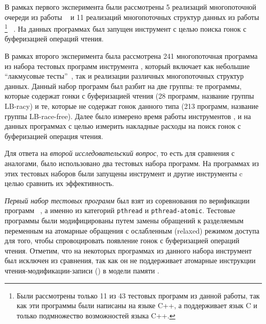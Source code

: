 В рамках первого эксперимента были рассмотрены 
5 реализаций многопоточной очереди из работы%
~\cite{Kokologiannakis:PLDI2019}
и 11 реализаций многопоточных структур данных из работы%
\footnote{Были рассмотрены только 11 из 43 
тестовых программ из данной работы, 
так как эти программы были написаны на языке C++,
а \genmc поддерживает язык C и только подмножество возможностей языка C++.}
~\cite{Ou-Demsky:OOPSLA18}.
На данных программах был запущен инструмент \wmc с целью 
поиска гонок с буферизацией операций чтения.


В рамках второго эксперимента была рассмотрена 241 многопоточная программа 
из набора тестовых программ инструмента \genmc, 
который включает как небольшие ``лакмусовые тесты''~\cite{Alglave-al:TACAS2011}, 
так и реализации различных многопоточных структур данных.
Данный набор программ был разбит на две группы:
те программы, которые содержат гонки с буферизацией чтения 
(28 программ, название группы LB-racy)
и те, которые не содержат гонок данного типа 
(213 программ, название группы LB-race-free).
Далее было измерено время работы инструментов \genmc, \hmc и \wmc на данных программах
с целью измерить накладные расходы на поиск гонок с буферизацией операция чтения.
  

Для ответа на \emph{второй исследовательский вопрос}, 
то есть для сравнения \wmc с аналогами, 
было использовано два тестовых набора программ.
На программах из этих тестовых наборов были запущены 
инструмент \wmc и другие инструменты c целью сравнить их эффективность.

\textit{Первый набор тестовых программ} был взят 
из соревнования по верификации программ \SVCOMP~\cite{SVCOMP}, 
а именно из категорий \texttt{pthread} и \texttt{pthread-atomic}.
Тестовые программы были модифицированы путем замены 
обращений к разделяемым переменным на атомарные обращения 
с ослабленным (relaxed) режимом доступа 
для того, чтобы спровоцировать появление гонок с буферизацией операций чтения. 
Отметим, что на некоторых программах из данного набора 
инструмент \Nidhugg был исключен из сравнения, так как он не поддерживает 
атомарные инструкции чтения-модификации-записи (\RMW) в модели памяти \POWER. 


